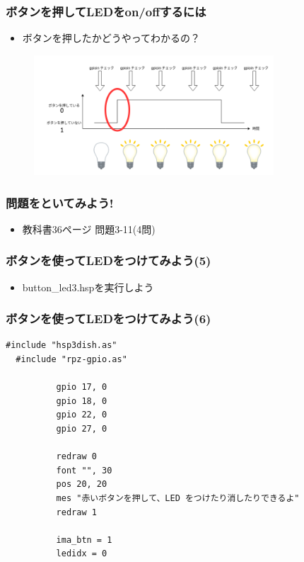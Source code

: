 \begin{frame}
  \frametitle{ボタンを押してLEDをon/offするには}
  \begin{itemize}
    \item ボタンを押したかどうやってわかるの？
  \end{itemize}
  \begin{figure}
    \centering
    \includegraphics[width=0.8\textwidth]{../images/chap03/button_push.png}
  \end{figure}
\end{frame}

\begin{frame}
  \frametitle{問題をといてみよう!}
  \begin{itemize}
    \item 教科書36ページ 問題3-11(4問)
  \end{itemize}
\end{frame}

\begin{frame}
  \frametitle{ボタンを使ってLEDをつけてみよう(5)}
    \begin{itemize}
    \item button\_led3.hspを実行しよう
  \end{itemize}
\end{frame}

\begin{frame}[fragile]
  \frametitle{ボタンを使ってLEDをつけてみよう(6)}
  \begin{lstlisting}[title=button\_led3.hsp, label=button_led3.hsp]
  #include "hsp3dish.as"
  #include "rpz-gpio.as"
  
          gpio 17, 0   
          gpio 18, 0
          gpio 22, 0
          gpio 27, 0

          redraw 0
          font "", 30
          pos 20, 20
          mes "赤いボタンを押して、LED をつけたり消したりできるよ"
          redraw 1

          ima_btn = 1 
          ledidx = 0
  \end{lstlisting}
\end{frame}

